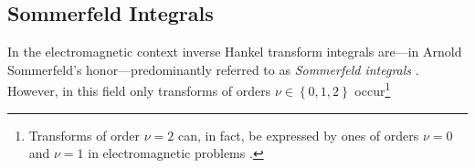 






\subsection{Sommerfeld Integrals}

In the electromagnetic context inverse Hankel transform integrals
are---in Arnold Sommerfeld's honor---predominantly referred to
as \emph{Sommerfeld integrals} \cite{Sommerfeld1909, Mosig2021}.
However, in this field only transforms of orders
$\nu \in \left\{0, 1, 2\right\}$ occur\footnote{Transforms of order $\nu = 2$
can, in fact, be expressed by ones of orders $\nu = 0$ and $\nu = 1$ in
electromagnetic problems \cite{Michalski2005}.}

